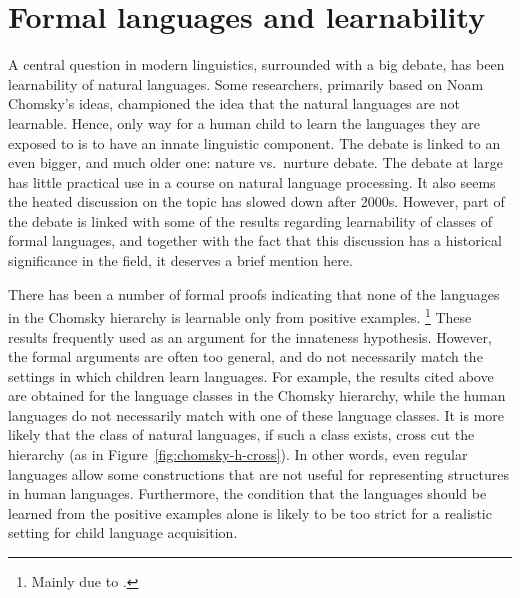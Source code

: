 \section{\label{sec:formal-lang-learnability}%
        Formal languages and learnability}

A central question in modern linguistics, surrounded with a big debate,
has been learnability of natural languages.
Some researchers, primarily based on Noam Chomsky's ideas,
championed the idea that the natural languages are not learnable.
Hence, only way for a human child to learn the languages they are exposed to
is to have an innate linguistic component.
The debate is linked to an even bigger, and much older one:
nature vs.\ nurture debate. 
The debate at large  has little practical use in a course
on natural language processing.
It also seems the heated discussion on the topic has slowed down after 2000s.
However, part of the debate is linked with some of the results regarding
learnability of classes of formal languages,
and together with the fact that this discussion has
a historical significance in the field,
it deserves a brief mention here.

There has been a number of formal proofs
indicating that none of the languages in the Chomsky hierarchy is
learnable only from positive examples.%
\footnote{Mainly due to \textcite{gold1967}.}
These results frequently used as an argument for the innateness hypothesis.
However, the formal arguments are often too general,
and do not necessarily match the settings in which children learn languages.
For example, the results cited above are obtained for the language classes
in the Chomsky hierarchy,
while the human languages do not necessarily match with
one of these language classes.
It is more likely that the class of natural languages,
if such a class exists,
cross cut the hierarchy (as in Figure~\ref{fig:chomsky-h-cross}).
In other words,
even regular languages allow some constructions
that are not useful for representing structures in human languages.
Furthermore,
the condition that the languages should be learned from
the positive examples alone is likely to be too strict
for a realistic setting for child language acquisition.

